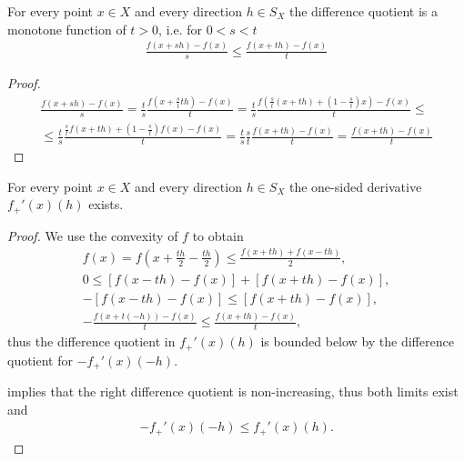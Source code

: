 \begin{lemma}
  \label{thm:convex_difference_quotient_grows}
  For every point $x \in X$ and every direction $h \in S_X$ the difference quotient is a monotone function of $t > 0$, i.e. for $0 < s < t$
  \begin{align*}
    \frac {f(x + sh) - f(x)} s
    \leq
    \frac {f(x + th) - f(x)} t
  \end{align*}
\end{lemma}
\begin{proof}
  \begin{align*}
    \frac {f(x + sh) - f(x)} s
    =
    \frac t s \frac {f(x + \frac s t t h) - f(x)} t
    =
    \frac t s \frac {f\left(\frac s t (x + th) + (1 - \frac s t) x \right) - f(x)} t
    \leq \\ \leq
    \frac t s \frac {\frac s t f(x + t h) + (1 - \frac s t) f(x) - f(x)} t
    =
    \frac t s \frac s t \frac {f(x + th) - f(x)} t
    =
    \frac {f(x + th) - f(x)} t
  \end{align*}
\end{proof}

\begin{proposition}\label{thm:convex_one_sided_derivatives_exist}
  For every point $x \in X$ and every direction $h \in S_X$ the one-sided derivative $f_+'(x)(h)$ exists.
\end{proposition}
\begin{proof}
  We use the convexity of $f$ to obtain
  \begin{align*}
    f(x) = f \left(x + \frac {th} 2 - \frac {th} 2 \right) \leq \frac {f(x + th) + f(x - th)} 2,
    \\
    0 \leq [f(x - th) - f(x)] + [f(x + th) - f(x)],
    \\
    -[f(x - th) - f(x)] \leq [f(x + th) - f(x)],
    \\
    -\frac {f(x + t(-h)) - f(x)} t \leq \frac {f(x + th) - f(x)} t,
  \end{align*}
  thus the difference quotient in $f_+'(x)(h)$ is bounded below by the difference quotient for $-f_+'(x)(-h)$.

   implies that the right difference quotient is non-increasing, thus both limits exist and
  \begin{align*}
    -f_+'(x)(-h) \leq f_+'(x)(h).
  \end{align*}
\end{proof}

